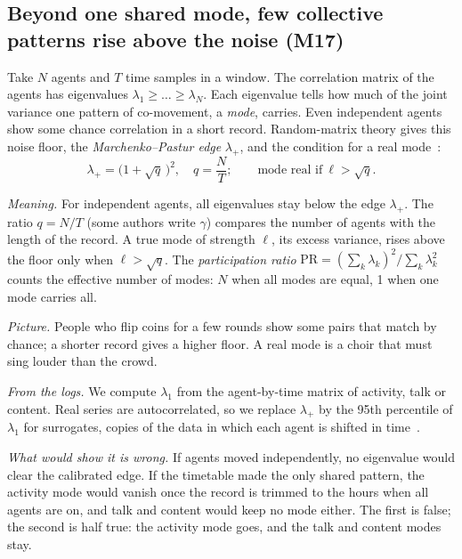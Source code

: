 \subsection{Beyond one shared mode, few collective patterns rise above the noise (M17)}\label{sec:p17}

Take $N$ agents and $T$ time samples in a window. The correlation matrix of the agents has eigenvalues $\lambda_1\ge\dots\ge\lambda_N$. Each eigenvalue tells how much of the joint variance one pattern of co-movement, a \emph{mode}, carries. Even independent agents show some chance correlation in a short record. Random-matrix theory gives this noise floor, the \emph{Marchenko--Pastur edge} $\lambda_+$, and the condition for a real mode~\cite{marchenko1967,baik2005}:
\begin{equation}
\lambda_+=\big(1+\sqrt q\,\big)^2,\quad q=\frac NT;\qquad
\text{mode real if}\ \ell>\sqrt q .
\label{eq:spike}
\end{equation}

\emph{Meaning.} For independent agents, all eigenvalues stay below the edge $\lambda_+$. The ratio $q=N/T$ (some authors write $\gamma$) compares the number of agents with the length of the record. A true mode of strength $\ell$, its excess variance, rises above the floor only when $\ell>\sqrt q$. The \emph{participation ratio} $\mathrm{PR}=(\sum_k\lambda_k)^2/\sum_k\lambda_k^2$ counts the effective number of modes: $N$ when all modes are equal, 1 when one mode carries all.

\emph{Picture.} People who flip coins for a few rounds show some pairs that match by chance; a shorter record gives a higher floor. A real mode is a choir that must sing louder than the crowd.

\emph{From the logs.} We compute $\lambda_1$ from the agent-by-time matrix of activity, talk or content. Real series are autocorrelated, so we replace $\lambda_+$ by the 95th percentile of $\lambda_1$ for surrogates, copies of the data in which each agent is shifted in time~\cite{laloux1999}.

\emph{What would show it is wrong.} If agents moved independently, no eigenvalue would clear the calibrated edge. If the timetable made the only shared pattern, the activity mode would vanish once the record is trimmed to the hours when all agents are on, and talk and content would keep no mode either. The first is false; the second is half true: the activity mode goes, and the talk and content modes stay.

